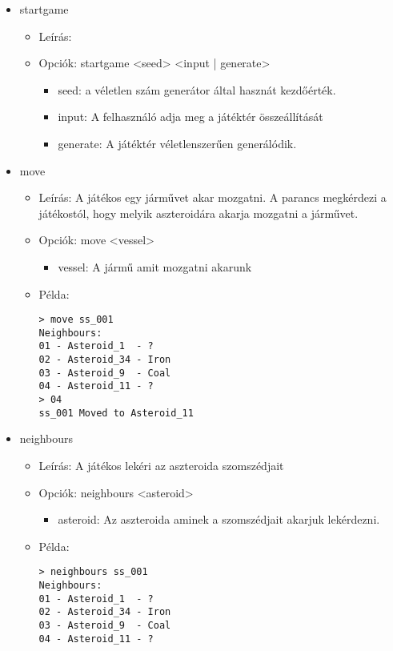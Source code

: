 \documentclass[../../projlab]{subfiles}
\begin{document}
\begin{itemize}
    \item startgame
    \begin{itemize}
        \item Leírás: 
        \item Opciók: startgame <seed> <input | generate>
        \begin{itemize}
            \item seed: a véletlen szám generátor által hasznát kezdőérték.
            \item input: A felhasználó adja meg a játéktér összeállítását
            \item generate: A játéktér véletlenszerűen generálódik.
        \end{itemize}
    \end{itemize}

    \item move
    \begin{itemize}
        \item Leírás: A játékos egy járművet akar mozgatni. \newline
            A parancs megkérdezi a játékostól, hogy melyik aszteroidára akarja mozgatni a járművet.
        \item Opciók: move <vessel>
        \begin{itemize}
            \item vessel: A jármű amit mozgatni akarunk
        \end{itemize}
        \item Példa:
            \begin{verbatim}
> move ss_001
Neighbours:
01 - Asteroid_1  - ?
02 - Asteroid_34 - Iron
03 - Asteroid_9  - Coal
04 - Asteroid_11 - ?
> 04
ss_001 Moved to Asteroid_11
            \end{verbatim}
    \end{itemize}


    \item neighbours
    \begin{itemize}
        \item Leírás: A játékos lekéri az aszteroida szomszédjait
        \item Opciók: neighbours <asteroid>
        \begin{itemize}
            \item asteroid: Az aszteroida aminek a szomszédjait akarjuk lekérdezni.
        \end{itemize}
        \item Példa:
            \begin{verbatim}
> neighbours ss_001
Neighbours:
01 - Asteroid_1  - ?
02 - Asteroid_34 - Iron
03 - Asteroid_9  - Coal
04 - Asteroid_11 - ?
            \end{verbatim}
    \end{itemize}



\end{itemize}
\end{document}
